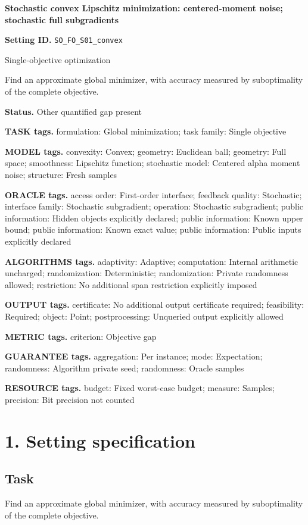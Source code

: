 \documentclass[10pt,a4paper]{article}
\begin{document}
\raggedright

{\LARGE\bfseries\sffamily\color{AtlasNavy} Stochastic convex Lipschitz minimization: centered-moment noise; stochastic full subgradients\par}\vspace{5pt}
\textbf{Setting ID.} \texttt{SO\_\allowbreak{}FO\_\allowbreak{}S01\_\allowbreak{}convex}

Single-objective optimization

Find an approximate global minimizer, with accuracy measured by suboptimality of the complete objective.

\textbf{Status.} Other quantified gap present

\textbf{TASK tags.} formulation: Global minimization; task family: Single objective

\textbf{MODEL tags.} convexity: Convex; geometry: Euclidean ball; geometry: Full space; smoothness: Lipschitz function; stochastic model: Centered alpha moment noise; structure: Fresh samples

\textbf{ORACLE tags.} access order: First-order interface; feedback quality: Stochastic; interface family: Stochastic subgradient; operation: Stochastic subgradient; public information: Hidden objects explicitly declared; public information: Known upper bound; public information: Known exact value; public information: Public inputs explicitly declared

\textbf{ALGORITHMS tags.} adaptivity: Adaptive; computation: Internal arithmetic uncharged; randomization: Deterministic; randomization: Private randomness allowed; restriction: No additional span restriction explicitly imposed

\textbf{OUTPUT tags.} certificate: No additional output certificate required; feasibility: Required; object: Point; postprocessing: Unqueried output explicitly allowed

\textbf{METRIC tags.} criterion: Objective gap

\textbf{GUARANTEE tags.} aggregation: Per instance; mode: Expectation; randomness: Algorithm private seed; randomness: Oracle samples

\textbf{RESOURCE tags.} budget: Fixed worst-case budget; measure: Samples; precision: Bit precision not counted

\section{1. Setting specification}
\subsection{Task}
Find an approximate global minimizer, with accuracy measured by suboptimality of the complete objective.
\end{document}
